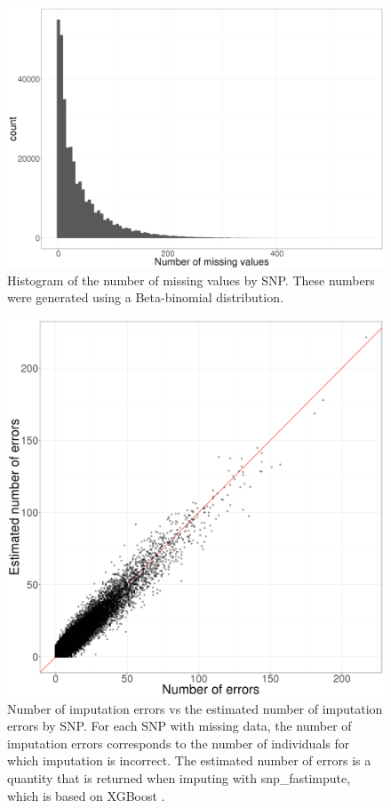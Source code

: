 \documentclass[a4paper, 11pt]{article}
\begin{document}
\begin{figure}[htpb]
\centerline{\includegraphics[width=\textwidth]{hist-NA}}
\caption{Histogram of the number of missing values by SNP. These numbers were generated using a Beta-binomial distribution.}\label{fig:NA}
\end{figure}

\begin{figure}[htpb]
\centerline{\includegraphics[width=\textwidth]{error-impute}}
\caption{Number of imputation errors vs the estimated number of imputation errors by SNP. For each SNP with missing data, the number of imputation errors corresponds to the number of individuals for which imputation is incorrect. The estimated number of errors is a quantity that is returned when imputing with snp\_fastimpute, which is based on XGBoost \cite[]{Chen2016}.}\label{fig:error-impute}
\end{figure}

\vspace*{-12pt}



\end{document}
